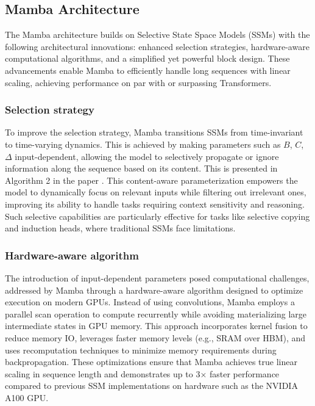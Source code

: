 \documentclass[12pt, conference, compsoc, onecolumn]{IEEEtran}
\begin{document}
	\subsection{Mamba Architecture}
	
	The Mamba architecture builds on Selective State Space Models (SSMs) with the following architectural innovations: enhanced selection strategies, hardware-aware computational algorithms, and a simplified yet powerful block design. These advancements enable Mamba to efficiently handle long sequences with linear scaling, achieving performance on par with or surpassing Transformers.
	
	\subsubsection{Selection strategy}
	To improve the selection strategy, Mamba transitions SSMs from time-invariant to time-varying dynamics. This is achieved by making parameters such as $B$, $C$, $\Delta$ input-dependent, allowing the model to selectively propagate or ignore information along the sequence based on its content. This is presented in Algorithm 2 in the paper \cite{gu2022efficientlymodelinglongsequences}. This content-aware parameterization empowers the model to dynamically focus on relevant inputs while filtering out irrelevant ones, improving its ability to handle tasks requiring context sensitivity and reasoning. Such selective capabilities are particularly effective for tasks like selective copying and induction heads, where traditional SSMs face limitations.
	
	\subsubsection{Hardware-aware algorithm}
	The introduction of input-dependent parameters posed computational challenges, addressed by Mamba through a hardware-aware algorithm designed to optimize execution on modern GPUs. Instead of using convolutions, Mamba employs a parallel scan operation to compute recurrently while avoiding materializing large intermediate states in GPU memory. This approach incorporates kernel fusion to reduce memory IO, leverages faster memory levels (e.g., SRAM over HBM), and uses recomputation techniques to minimize memory requirements during backpropagation. These optimizations ensure that Mamba achieves true linear scaling in sequence length and demonstrates up to 3× faster performance compared to previous SSM implementations on hardware such as the NVIDIA A100 GPU.
	
\end{document}
